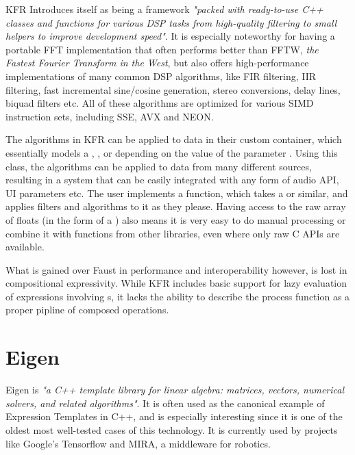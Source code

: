KFR Introduces itself as being a framework \emph{"packed with ready-to-use C++ classes and functions for various DSP tasks from high-quality filtering to small helpers to improve development speed"}\autocite{kfrwebsite}. It is especially noteworthy for having a portable FFT implementation that often performs better than FFTW, \emph{the Fastest Fourier Transform in the West}\autocite{FFTW05}, but also offers high-performance implementations of many common DSP algorithms, like FIR filtering, IIR filtering, fast incremental sine/cosine generation, stereo conversions, delay lines, biquad filters etc\autocite{kfrwebsite}. All of these algorithms are optimized for various SIMD instruction sets, including SSE, AVX and NEON.

The algorithms in KFR can be applied to data in their custom  container, which essentially models a , , or  depending on the value of the parameter . Using this class, the algorithms can be applied to data from many different sources, resulting in a system that can be easily integrated with any form of audio API, UI parameters etc. The user implements a  function, which takes a  or similar, and applies filters and algorithms to it as they please. Having access to the raw array of floats (in the form of a ) also means it is very easy to do manual processing or combine it with functions from other libraries, even where only raw C APIs are available.

What is gained over Faust in performance and interoperability however, is lost in compositional expressivity. While KFR includes basic support for lazy evaluation of expressions involving s, it lacks the ability to describe the process function as a proper pipline of composed operations.

\section{Eigen}

Eigen is \emph{"a C++ template library for linear algebra: matrices, vectors, numerical solvers, and related algorithms"}\autocite{eigenweb}. It is often used as the canonical example of Expression Templates in C++, and is especially interesting since it is one of the oldest most well-tested cases of this technology. It is currently used by projects like Google's Tensorflow\autocite{tensorflow2015-whitepaper} and MIRA, a middleware for robotics\autocite{Einhorn2012-bx}.

